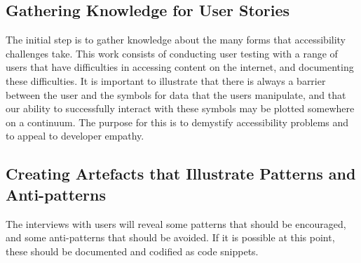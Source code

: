 
\subsection{Gathering Knowledge for User Stories} %
\label{sub:part_1_gathering_knowledge_for_user_stories}
The initial step is to gather knowledge about the many forms that accessibility challenges take. This work consists of conducting user testing with a range of users that have difficulties in accessing content on the internet, and documenting these difficulties. 
It is important to illustrate that there is always a barrier between the user and the symbols for data that the users manipulate, and that our ability to successfully interact with these symbols may be plotted somewhere on a continuum. The purpose for this is to demystify accessibility problems and to appeal to developer empathy.


\subsection{Creating Artefacts that Illustrate Patterns and Anti-patterns} %
\label{sub:part_2_creating_artefacts_that_illustrate_patterns_and_anti_patterns}

The interviews with users will reveal some patterns that should be encouraged, and some anti-patterns that should be avoided. If it is possible at this point, these should be documented and codified as code snippets.


